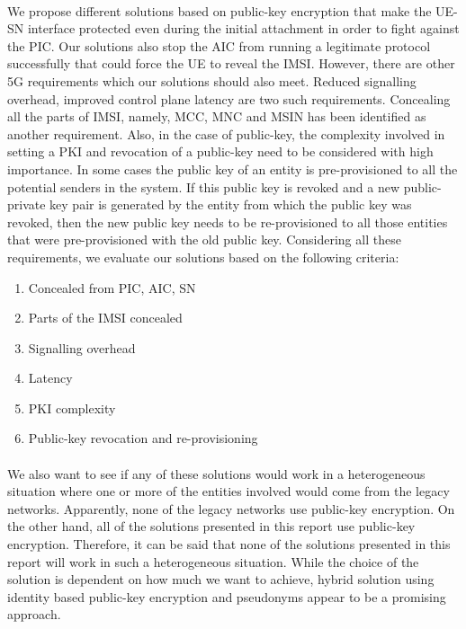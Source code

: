 \documentclass[lnicst,sechang,a4paper]{svmultln}
\begin{document}
\paragraph{}
We propose different solutions based on public-key encryption that make the UE-SN interface protected even during the initial attachment in order to fight against the PIC. Our solutions also stop the AIC from running a legitimate protocol successfully that could force the UE to reveal the IMSI. However, there are other 5G requirements which our solutions should also meet. Reduced signalling overhead, improved control plane latency are two such requirements. Concealing all the parts of IMSI, namely, MCC, MNC and MSIN has been identified as another requirement. Also, in the case of public-key, the complexity involved in setting a PKI and revocation of a public-key need to be considered with high importance. In some cases the public key of an entity is pre-provisioned to all the potential senders in the system. If this public key is revoked and a new public-private key pair is generated by the entity from which the public key was revoked, then the new public key needs to be re-provisioned to all those entities that were pre-provisioned with the old public key. Considering all these requirements, we evaluate our solutions based on the following criteria:
\begin{enumerate}
\item Concealed from PIC, AIC, SN
\item Parts of the IMSI concealed
\item Signalling overhead
\item Latency
\item PKI complexity
\item Public-key revocation and re-provisioning 
\end{enumerate}
\paragraph{}
We also want to see if any of these solutions would work in a heterogeneous situation where one or more of the entities involved would come from the legacy networks. Apparently, none of the legacy networks use public-key encryption. On the other hand, all of the solutions presented in this report use public-key encryption. Therefore, it can be said that none of the solutions presented in this report will work in such a heterogeneous situation. While the choice of the solution is dependent on how much we want to achieve, hybrid solution using identity based public-key encryption and pseudonyms appear to be a promising approach.
\end{document}

